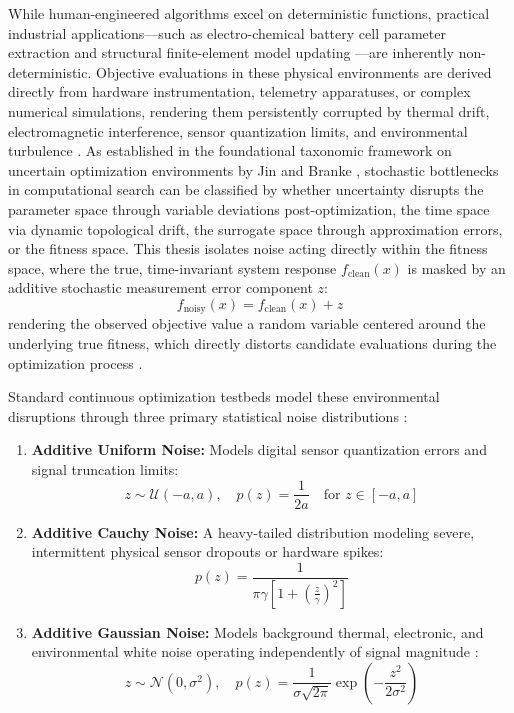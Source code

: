 While human-engineered algorithms excel on deterministic functions, practical industrial applications—such as electro-chemical battery cell parameter extraction \cite{Plett2004, Xiong2018} and structural finite-element model updating \cite{Mottershead1993, Marwala2010}—are inherently non-deterministic. Objective evaluations in these physical environments are derived directly from hardware instrumentation, telemetry apparatuses, or complex numerical simulations, rendering them persistently corrupted by thermal drift, electromagnetic interference, sensor quantization limits, and environmental turbulence \cite{Plett2004, Xiong2018}. As established in the foundational taxonomic framework on uncertain optimization environments by Jin and Branke \cite{Jin2005}, stochastic bottlenecks in computational search can be classified by whether uncertainty disrupts the parameter space through variable deviations post-optimization, the time space via dynamic topological drift, the surrogate space through approximation errors, or the fitness space. This thesis isolates noise acting directly within the fitness space, where the true, time-invariant system response $f_{\text{clean}}(x)$ is masked by an additive stochastic measurement error component $z$:
\begin{equation}\label{eq:noisy_evaluation}
    f_{\text{noisy}}(x) = f_{\text{clean}}(x) + z
\end{equation}
rendering the observed objective value a random variable centered around the underlying true fitness, which directly distorts candidate evaluations during the optimization process \cite{Jin2005}.

Standard continuous optimization testbeds model these environmental disruptions through three primary statistical noise distributions \cite{Hansen2009Noisy}:
\begin{enumerate}
    \item \textbf{Additive Uniform Noise:} Models digital sensor quantization errors and signal truncation limits:
    \begin{equation}
        z \sim \mathcal{U}(-a, a), \quad p(z) = \frac{1}{2a} \quad \text{for } z \in [-a, a]
    \end{equation}
    
    \item \textbf{Additive Cauchy Noise:} A heavy-tailed distribution modeling severe, intermittent physical sensor dropouts or hardware spikes:
    \begin{equation}
        p(z) = \frac{1}{\pi \gamma \left[1 + \left(\frac{z}{\gamma}\right)^2\right]}
    \end{equation}
    
    \item \textbf{Additive Gaussian Noise:} Models background thermal, electronic, and environmental white noise operating independently of signal magnitude \cite{Hansen2009Noisy}:
    \begin{equation}\label{eq:gaussian_noise}
        z \sim \mathcal{N}(0, \sigma^2), \quad p(z) = \frac{1}{\sigma \sqrt{2\pi}} \exp\left(-\frac{z^2}{2\sigma^2}\right)
    \end{equation}
\end{enumerate}


